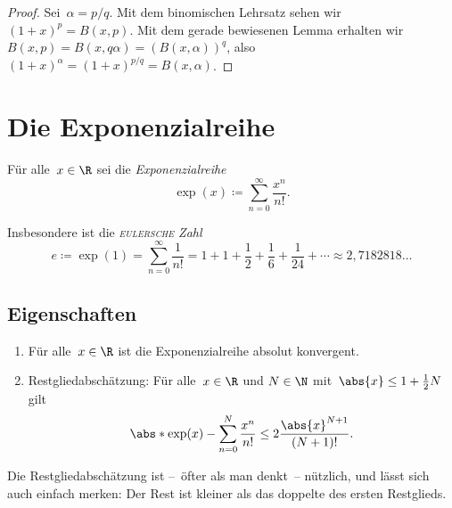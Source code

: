 \documentclass[a4paper]{article}
\begin{document}
\begin{proof}
    Sei~$\alpha = p/q$. Mit dem binomischen Lehrsatz sehen wir $(1+x)^p = B(x,p)$. Mit dem gerade bewiesenen Lemma erhalten wir $B(x,p) = B(x,q\alpha) = (B(x,\alpha))^q$, also $(1+x)^\alpha = (1+x)^{p/q} = B(x,\alpha)$.
\end{proof}

\section{Die Exponenzialreihe}

\begin{definition}
    Für alle~$x \in \R$ sei die \emph{Exponenzialreihe}
    \begin{equation*}
        \exp(x) \coloneqq \sum_{n=0}^\infty \frac{x^n}{n!}.
    \end{equation*}

    Insbesondere ist die \emph{\textsc{eulersche} Zahl}
    \begin{equation*}
        e \coloneqq \exp(1) = \sum_{n=0}^\infty \frac{1}{n!} = 1 + 1 + \frac{1}{2} + \frac{1}{6} + \frac{1}{24} + \cdots \approx 2,7182818\dots
    \end{equation*}
\end{definition}

\subsection{Eigenschaften}

\begin{theorem}\leavevmode
    \begin{enumerate}
        \item Für alle~$x \in \R$ ist die Exponenzialreihe absolut konvergent.
        \item Restgliedabschätzung: Für alle~$x \in \R$ und $N \in \N$ mit~$\abs{x} \leq 1+\frac{1}{2}N$ gilt
              \begin{equation*}
                  \abs*{\exp(x) - \sum_{n=0}^N \frac{x^n}{n!}} \leq 2 \frac{\abs{x}^{N+1}}{(N+1)!}.
              \end{equation*}
    \end{enumerate}
\end{theorem}

Die Restgliedabschätzung ist --~öfter als man denkt~-- nützlich, und lässt sich auch einfach merken: Der Rest ist kleiner als das doppelte des ersten Restglieds.
\end{document}

